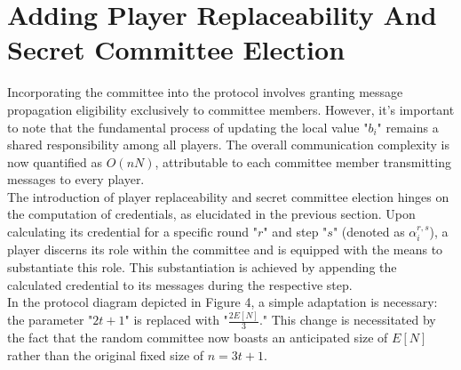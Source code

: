 \documentclass{report}
\begin{document}
\section{Adding Player Replaceability And Secret Committee Election}
Incorporating the committee into the protocol involves granting message propagation eligibility exclusively to committee members. However, it's important to note that the fundamental process of updating the local value "$b_{i}$" remains a shared responsibility among all players. The overall communication complexity is now quantified as $O(nN)$, attributable to each committee member transmitting messages to every player.\\
The introduction of player replaceability and secret committee election hinges on the computation of credentials, as elucidated in the previous section. Upon calculating its credential for a specific round "$r$" and step "$s$" (denoted as $\alpha_{i}^{r, s}$), a player discerns its role within the committee and is equipped with the means to substantiate this role. This substantiation is achieved by appending the calculated credential to its messages during the respective step.\\
In the protocol diagram depicted in Figure 4, a simple adaptation is necessary: the parameter "$2t + 1$" is replaced with "$\frac{2E[N]}{3}$." This change is necessitated by the fact that the random committee now boasts an anticipated size of $E[N]$ rather than the original fixed size of $n = 3t + 1$.
\end{document}
